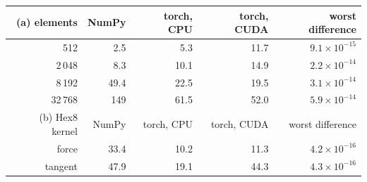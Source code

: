 \begin{tabular}{@{}r r r r r@{}}
\toprule
(a) elements & NumPy & torch, CPU & torch, CUDA & worst difference \\
\midrule
512 & 2.5 & 5.3 & 11.7 & $9.1\times10^{-15}$ \\
2\,048 & 8.3 & 10.1 & 14.9 & $2.2\times10^{-14}$ \\
8\,192 & 49.4 & 22.5 & 19.5 & $3.1\times10^{-14}$ \\
32\,768 & 149 & 61.5 & 52.0 & $5.9\times10^{-14}$ \\
\midrule
(b) Hex8 kernel & NumPy & torch, CPU & torch, CUDA & worst difference \\
\midrule
force & 33.4 & 10.2 & 11.3 & $4.2\times10^{-16}$ \\
tangent & 47.9 & 19.1 & 44.3 & $4.3\times10^{-16}$ \\
\bottomrule
\end{tabular}
